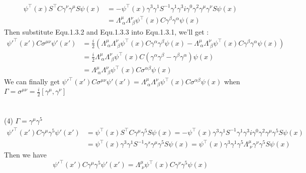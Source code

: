 \documentclass[12pt]{article}
\begin{document}
\begin{spacing}{1.5}
\begin{equation}
\begin{aligned}
\displaystyle \psi^{\top}(x)S^{\top}C\gamma^{\nu}\gamma^{\mu}S\psi(x) &= -\psi^{\top}(x)\gamma^{3}\gamma^{1}S^{-1}\gamma^{1}\gamma^{3}i\gamma^{0}\gamma^{2}\gamma^{\mu}\gamma^{\nu}S\psi(x) \\
&=\Lambda^{\mu}_{\;\alpha}\Lambda^{\nu}_{\;\beta}\psi^{\top}(x)C\gamma^{\beta}\gamma^{\alpha}\psi(x)
\end{aligned}	\tag{1.3.3}	
\end{equation}
Then substitute Equ.1.3.2 and Equ.1.3.3 into Equ.1.3.1, we'll get :
\begin{align*}
\psi'^{\top}(x')C\sigma^{\mu\nu}\psi'(x') &= \frac{i}{2}(\Lambda^{\mu}_{\;\alpha}\Lambda^{\nu}_{\;\beta}\psi^{\top}(x)C\gamma^{\alpha}\gamma^{\beta}\psi(x)-\Lambda^{\mu}_{\;\alpha}\Lambda^{\nu}_{\;\beta}\psi^{\top}(x)C\gamma^{\beta}\gamma^{\alpha}\psi(x))\\
&=\frac{i}{2}\Lambda^{\mu}_{\;\alpha}\Lambda^{\nu}_{\;\beta}\psi^{\top}(x)C(\gamma^{\alpha}\gamma^{\beta}-\gamma^{\beta}\gamma^{\alpha})\psi(x)\\
&=\Lambda^{\mu}_{\;\alpha}\Lambda^{\nu}_{\;\beta}\psi^{\top}(x)C\sigma^{\alpha\beta}\psi(x)
	\tag{1.3.4}	
\end{align*}
We can finally get $\displaystyle \psi'^{\top}(x')C\sigma^{\mu\nu}\psi'(x')=\Lambda^{\mu}_{\;\alpha}\Lambda^{\nu}_{\;\beta}\psi^{\top}(x)C\sigma^{\alpha\beta}\psi(x)$ when $\displaystyle \Gamma=\sigma^{\mu\nu}=\frac{i}{2}[\gamma^{\mu},\gamma^{\nu}]$\\
~\\
~\\
(4) $\Gamma=\gamma^{\mu}\gamma^{5}$\\
\begin{equation}
\begin{aligned}
\displaystyle \psi'^{\top}(x')C\gamma^{\mu}\gamma^{5}\psi'(x') &=\psi^{\top}(x)S^{\top}C\gamma^{\mu}\gamma^{5}S\psi(x)=-\psi^{\top}(x)\gamma^{3}\gamma^{1}S^{-1}\gamma^{1}\gamma^{3}i\gamma^{0}\gamma^{2}\gamma^{\mu}\gamma^{5}S\psi(x) \\
&=\psi^{\top}(x)\gamma^{3}\gamma^{1}S^{-1}\gamma^{s}\gamma^{\mu}\gamma^{5}S\psi(x)=\psi^{\top}(x)\gamma^{3}\gamma^{1}\gamma^{5}\Lambda^{\mu}_{\;\nu}\gamma^{\nu}\gamma^{5}S\psi(x)
\end{aligned}		\tag{1.4.1}
\end{equation}
Then we have
\begin{equation}
\psi'^{\top}(x')C\gamma^{\mu}\gamma^{5}\psi'(x')=\Lambda^{\mu}_{\;\nu}\psi^{\top}(x)C\gamma^{\nu}\gamma^{5}\psi(x)
		\tag{1.4.2}
\end{equation}

\end{spacing}
\end{document}
